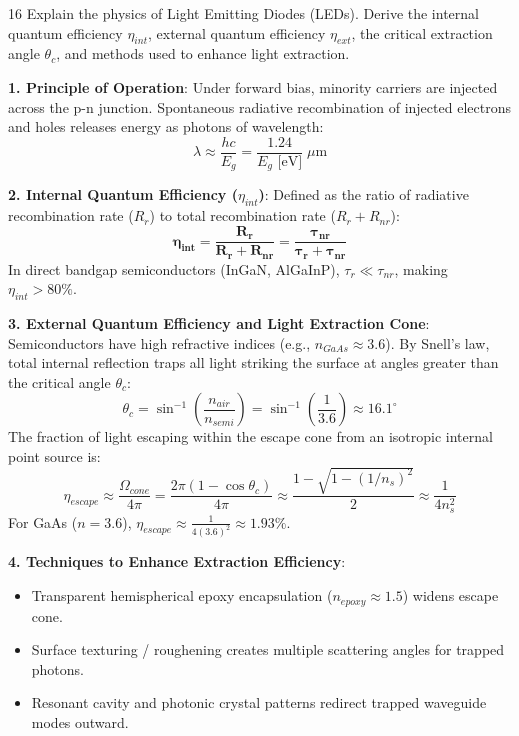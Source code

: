 \begin{theoryq}{16}
Explain the physics of Light Emitting Diodes (LEDs). Derive the internal quantum efficiency $\eta_{int}$, external quantum efficiency $\eta_{ext}$, the critical extraction angle $\theta_c$, and methods used to enhance light extraction.
\end{theoryq}
\begin{theorysol}
\textbf{1. Principle of Operation}:
Under forward bias, minority carriers are injected across the p-n junction. Spontaneous radiative recombination of injected electrons and holes releases energy as photons of wavelength:
\begin{equation}
\lambda \approx \frac{h c}{E_g} = \frac{1.24}{E_g\text{ [eV]}}\; \mu\text{m}
\end{equation}

\textbf{2. Internal Quantum Efficiency ($\eta_{int}$)}:
Defined as the ratio of radiative recombination rate ($R_r$) to total recombination rate ($R_r + R_{nr}$):
\begin{equation}
\mathbf{\eta_{int} = \frac{R_r}{R_r + R_{nr}} = \frac{\tau_{nr}}{\tau_r + \tau_{nr}}}
\end{equation}
In direct bandgap semiconductors (InGaN, AlGaInP), $\tau_r \ll \tau_{nr}$, making $\eta_{int} > 80\%$.

\textbf{3. External Quantum Efficiency and Light Extraction Cone}:
Semiconductors have high refractive indices (e.g., $n_{GaAs} \approx 3.6$).
By Snell's law, total internal reflection traps all light striking the surface at angles greater than the critical angle $\theta_c$:
\begin{equation}
\theta_c = \sin^{-1}\left(\frac{n_{air}}{n_{semi}}\right) = \sin^{-1}\left(\frac{1}{3.6}\right) \approx 16.1^\circ
\end{equation}
The fraction of light escaping within the escape cone from an isotropic internal point source is:
\begin{equation}
\eta_{escape} \approx \frac{\Omega_{cone}}{4\pi} = \frac{2\pi(1 - \cos\theta_c)}{4\pi} \approx \frac{1 - \sqrt{1 - (1/n_s)^2}}{2} \approx \frac{1}{4 n_s^2}
\end{equation}
For GaAs ($n=3.6$), $\eta_{escape} \approx \frac{1}{4(3.6)^2} \approx 1.93\%$.

\textbf{4. Techniques to Enhance Extraction Efficiency}:
\begin{itemize}
\item Transparent hemispherical epoxy encapsulation ($n_{epoxy} \approx 1.5$) widens escape cone.
\item Surface texturing / roughening creates multiple scattering angles for trapped photons.
\item Resonant cavity and photonic crystal patterns redirect trapped waveguide modes outward.
\end{itemize}

\end{theorysol}
\vspace{4mm}

